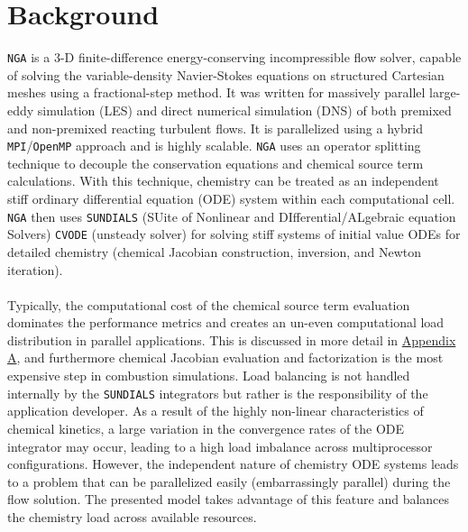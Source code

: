 \documentclass{homework}
\begin{document}
\section{\textbf{Background}}
\noindent \texttt{NGA} is a 3-D finite-difference energy-conserving incompressible flow solver, capable of solving the variable-density Navier-Stokes equations on structured Cartesian meshes using a fractional-step method. It was written for massively parallel large-eddy simulation (LES) and direct numerical simulation (DNS) of both premixed and non-premixed reacting turbulent flows. It is parallelized using a hybrid \texttt{MPI}/\texttt{OpenMP} approach and is highly scalable. \texttt{NGA} uses an operator splitting technique to decouple the conservation equations and chemical source term calculations. With this technique, chemistry can be treated as an independent stiff ordinary differential equation (ODE) system within each computational cell. \texttt{NGA} then uses \texttt{SUNDIALS} \cite{SUNDIALS} (SUite of Nonlinear and DIfferential/ALgebraic equation Solvers) \texttt{CVODE} (unsteady solver) for solving stiff systems of initial value ODEs for detailed chemistry (chemical Jacobian construction, inversion, and Newton iteration). 
\\ \\ \noindent
Typically, the computational cost of the chemical source term evaluation dominates the performance metrics and creates an un-even computational load distribution in parallel applications. This is discussed in more detail in \hyperref[appendixA]{Appendix A}, and furthermore chemical Jacobian evaluation and factorization is the most expensive step in combustion simulations. Load balancing is not handled internally by the \texttt{SUNDIALS} integrators but rather is the responsibility of the application developer. As a result of the highly non-linear characteristics of chemical kinetics, a large variation in the convergence rates of the ODE integrator may occur, leading to a high load imbalance across multiprocessor configurations. However, the independent nature of chemistry ODE systems leads to a problem that can be parallelized easily (embarrassingly parallel) during the flow solution. The presented model takes advantage of this feature and balances the chemistry load across available resources.
\end{document}
